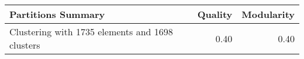 \begin{tabular}{lrr}
\toprule
                             Partitions Summary &  Quality &  Modularity \\
\midrule
Clustering with 1735 elements and 1698 clusters &     0.40 &        0.40 \\
\bottomrule
\end{tabular}
